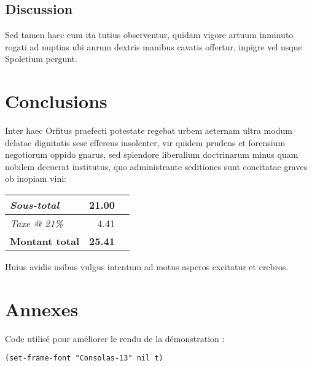 \documentclass[11pt]{report}
\begin{document}
\section{Discussion}
\label{sec:orgb7951f1}

Sed tamen haec cum ita tutius observentur, quidam vigore artuum inminuto rogati
ad nuptias ubi aurum dextris manibus cavatis offertur, inpigre vel usque
Spoletium pergunt.

\chapter{Conclusions}
\label{sec:org35d057b}

Inter haec Orfitus praefecti potestate regebat urbem aeternam ultra modum
delatae dignitatis sese efferens insolenter, vir quidem prudens et forensium
negotiorum oppido gnarus, sed splendore liberalium doctrinarum minus quam
nobilem decuerat institutus, quo administrante seditiones sunt concitatae graves
ob inopiam vini:

\begin{center}
\begin{tabular}{lrl}
\emph{Sous-total} & 21.00 & \texteuro{}\\
\hline
\emph{Taxe @ 21\%} & 4.41 & \texteuro{}\\
\hline
\textbf{Montant total} & \textbf{\large{25.41}} & \textbf{\texteuro{}}\\
\end{tabular}
\end{center}

Huius avidis usibus vulgus intentum ad motus asperos excitatur et crebros.

\chapter{Annexes}
\label{sec:orgedaa456}

Code utilisé pour améliorer le rendu de la démonstration :

\lstset{language=Lisp,label= ,caption= ,captionpos=b,numbers=none}
\begin{lstlisting}
(set-frame-font "Consolas-13" nil t)
\end{lstlisting}
\end{document}
